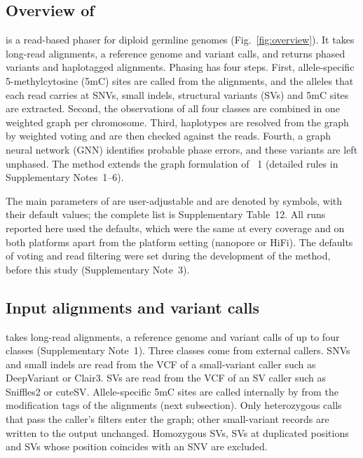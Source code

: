 
\subsection*{Overview of \toolname}
\toolname is a read-based phaser for diploid germline genomes (Fig.~\ref{fig:overview}).  It takes long-read alignments, a reference genome and variant calls, and returns phased variants and haplotagged alignments.  Phasing has four steps.  First, allele-specific 5-methylcytosine (5mC) sites are called from the alignments, and the alleles that each read carries at SNVs, small indels, structural variants (SVs) and 5mC sites are extracted.  Second, the observations of all four classes are combined in one weighted graph per chromosome.  Third, haplotypes are resolved from the graph by weighted voting and are then checked against the reads.  Fourth, a graph neural network (GNN) identifies probable phase errors, and these variants are left unphased.  The method extends the graph formulation of \longphase~1\cite{lin2022longphase} (detailed rules in Supplementary Notes~1--6).

The main parameters of \toolname are user-adjustable and are denoted by symbols, with their default values; the complete list is Supplementary Table~12.  All runs reported here used the defaults, which were the same at every coverage and on both platforms apart from the platform setting (nanopore or HiFi).  The defaults of voting and read filtering were set during the development of the method, before this study (Supplementary Note~3).

\subsection*{Input alignments and variant calls}
\toolname takes long-read alignments, a reference genome and variant calls of up to four classes (Supplementary Note~1).  Three classes come from external callers.  SNVs and small indels are read from the VCF of a small-variant caller such as DeepVariant\cite{poplin2018deepvariant} or Clair3\cite{zheng2022clair3}.  SVs are read from the VCF of an SV caller such as Sniffles2\cite{smolka2024sniffles2} or cuteSV\cite{jiang2020cutesv}.  Allele-specific 5mC sites are called internally by \toolname from the modification tags of the alignments (next subsection).  Only heterozygous calls that pass the caller's filters enter the graph; other small-variant records are written to the output unchanged.  Homozygous SVs, SVs at duplicated positions and SVs whose position coincides with an SNV are excluded.

